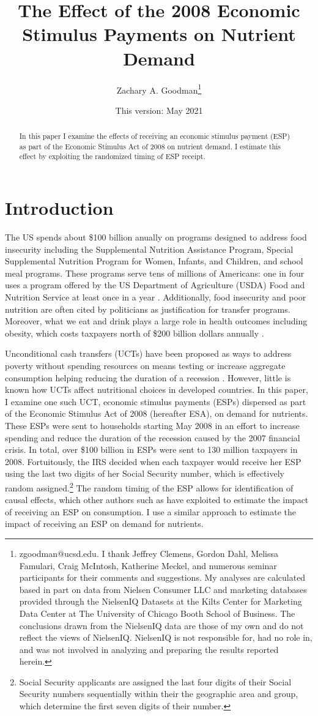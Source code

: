 \documentclass[12pt]{article}
\title{The Effect of the 2008 Economic Stimulus Payments on Nutrient Demand}
\author{Zachary A. Goodman\thanks{zgoodman@ucsd.edu. I thank Jeffrey Clemens, Gordon Dahl, Melissa Famulari, Craig McIntosh, Katherine Meckel, and numerous seminar participants for their comments and suggestions. My analyses are calculated based in part on data from Nielsen Consumer LLC and marketing databases provided through the NielsenIQ Datasets at the Kilts Center for Marketing Data Center at The University of Chicago Booth School of Business. The conclusions drawn from the NielsenIQ data are those of my own and do not reflect the views of NielsenIQ. NielsenIQ is not responsible for, had no role in, and was not involved in analyzing and preparing the results reported herein.}}
\affil{University of California, San Diego}
\date{This version: May 2021}
\begin{document}
\maketitle

\begin{abstract}
In this paper I examine the effects of receiving an economic stimulus payment (ESP) as part of the Economic Stimulus Act of 2008 on nutrient demand. I estimate this effect by exploiting the randomized timing of ESP receipt.
\end{abstract}

\pagebreak

\doublespacing

\section{Introduction} \label{introduction}

The US spends about \$100 billion anually on programs designed to address food insecurity including the Supplemental Nutrition Assistance Program, Special Supplemental Nutrition Program for Women, Infants, and Children, and school meal programs. These programs serve tens of millions of Americans: one in four uses a program offered by the US Department of Agriculture (USDA) Food and Nutrition Service at least once in a year \parencite{usdafns}. Additionally, food insecurity and poor nutrition are often cited by politicians as justification for transfer programs. Moreover, what we eat and drink plays a large role in health outcomes including obesity, which costs taxpayers north of \$200 billion dollars annually \parencite{cawley2012medical}.

Unconditional cash transfers (UCTs) have been proposed as ways to address poverty without spending resources on means testing \parencite{} or increase aggregate consumption helping reducing the duration of a recession \parencite{}. However, little is known how UCTs affect nutritional choices in developed countries. In this paper, I examine one such UCT, economic stimulus payments (ESPs) dispersed as part of the Economic Stimulus Act of 2008 (hereafter ESA), on demand for nutrients. These ESPs were sent to households starting May 2008 in an effort to increase spending and reduce the duration of the recession caused by the 2007 financial crisis. In total, over \$100 billion in ESPs were sent to 130 million taxpayers in 2008. Fortuitously, the IRS decided when each taxpayer would receive her ESP using the last two digits of her Social Security number, which is effectively random assigned.\footnote{Social Security applicants are assigned the last four digits of their Social Security numbers sequentially within their the geographic area and group, which determine the first seven digits of their number.} The random timing of the ESP allows for identification of causal effects, which other authors such as \textcite{broda2014economic} have exploited to estimate the impact of receiving an ESP on consumption. I use a similar approach to estimate the impact of receiving an ESP on demand for nutrients.
\end{document}
